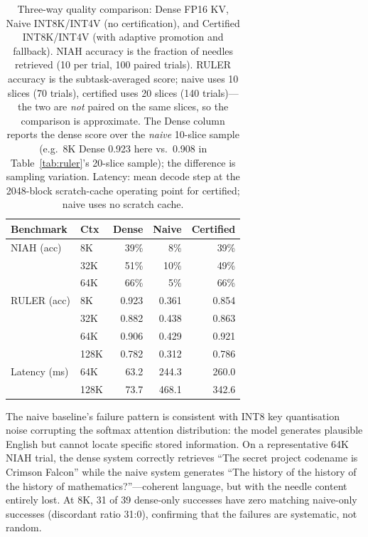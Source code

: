 \documentclass[10pt,twocolumn,a4paper]{article}
\theoremstyle{definition}
\theoremstyle{remark}
\begin{document}
\begin{table}[ht]
\centering
\caption{Three-way quality comparison: Dense FP16 KV, Naive INT8K/INT4V (no certification), and Certified INT8K/INT4V (with adaptive promotion and fallback).  NIAH accuracy is the fraction of needles retrieved (10 per trial, 100 paired trials).  RULER accuracy is the subtask-averaged score; naive uses 10 slices (70 trials), certified uses 20 slices (140 trials)---the two are \emph{not} paired on the same slices, so the comparison is approximate.  The Dense column reports the dense score over the \emph{naive} 10-slice sample (e.g.\ 8K Dense 0.923 here vs.\ 0.908 in Table~\ref{tab:ruler}'s 20-slice sample); the difference is sampling variation.  Latency: mean decode step at the 2048-block scratch-cache operating point for certified; naive uses no scratch cache.}
\label{tab:naive}
\small
\begin{tabular}{@{}llrrr@{}}
\toprule
\textbf{Benchmark} & \textbf{Ctx} & \textbf{Dense} & \textbf{Naive} & \textbf{Certified} \\
\midrule
NIAH (acc)   & 8K   & 39\% & 8\%  & 39\% \\
             & 32K  & 51\% & 10\% & 49\% \\
             & 64K  & 66\% & 5\%  & 66\% \\
\midrule
RULER (acc)  & 8K   & 0.923 & 0.361 & 0.854 \\
             & 32K  & 0.882 & 0.438 & 0.863 \\
             & 64K  & 0.906 & 0.429 & 0.921 \\
             & 128K & 0.782 & 0.312 & 0.786 \\
\midrule
Latency (ms) & 64K  & 63.2  & 244.3 & 260.0 \\
             & 128K & 73.7  & 468.1 & 342.6 \\
\bottomrule
\end{tabular}
\end{table}

The naive baseline's failure pattern is consistent with INT8 key quantisation noise corrupting the softmax attention distribution: the model generates plausible English but cannot locate specific stored information.  On a representative 64K NIAH trial, the dense system correctly retrieves ``The secret project codename is Crimson Falcon'' while the naive system generates ``The history of the history of the history of mathematics?''---coherent language, but with the needle content entirely lost.  At 8K, 31 of 39 dense-only successes have zero matching naive-only successes (discordant ratio 31:0), confirming that the failures are systematic, not random.
\end{document}
